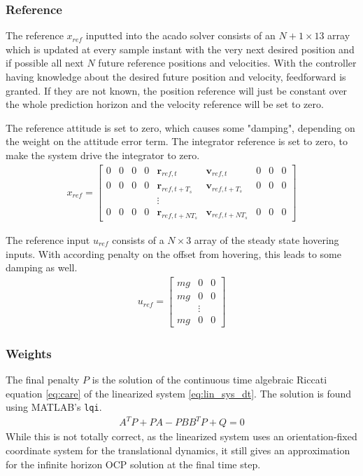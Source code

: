 \subsubsection{Reference}
The reference $x_{ref}$ inputted into the acado solver consists of an $N+1\times13$ array which is updated at every sample instant with the very next desired position and if possible all next $N$ future reference positions and velocities. With the controller having knowledge about the desired future position and velocity, feedforward is granted. If they are not known, the position reference will just be constant over the whole prediction horizon and the velocity reference will be set to zero. 

The reference attitude is set to zero, which causes some "damping", depending on the weight on the attitude error term. The integrator reference is set to zero, to make the system drive the integrator to zero.
\begin{align}
x_{ref} = \begin{bmatrix}
0 & 0 & 0 & 0 & \mathbf{r}_{ref,t} & \mathbf{v}_{ref,t} & 0 & 0 & 0 \\
0 & 0 & 0 & 0 & \mathbf{r}_{ref,t+T_s} & \mathbf{v}_{ref,t+T_s} & 0 & 0 & 0 \\
 &  &  &  & \vdots &  &  &  &  \\
0 & 0 & 0 & 0 & \mathbf{r}_{ref,t+NT_s} & \mathbf{v}_{ref,t+NT_s} & 0 & 0 & 0 
\end{bmatrix}
\end{align}

The reference input $u_{ref}$ consists of a $N\times3$ array of the steady state hovering inputs. With according penalty on the offset from hovering, this leads to some damping as well.
\begin{align}
u_{ref} = \begin{bmatrix}
mg & 0 & 0 \\
mg & 0 & 0 \\
  & \vdots &  \\
mg & 0 & 0 
\end{bmatrix}
\end{align}
\subsubsection{Weights}
The final penalty $P$ is the solution of the continuous time algebraic Riccati equation \ref{eq:care} of the linearized system \ref{eq:lin_sys_dt}. The solution is found using MATLAB's \texttt{lqi}.
\begin{align}
A^TP+PA-PBB^TP+Q=0\label{eq:care}
\end{align}
While this is not totally correct, as the linearized system uses an orientation-fixed coordinate system for the translational dynamics, it still gives an approximation for the infinite horizon OCP solution at the final time step.
